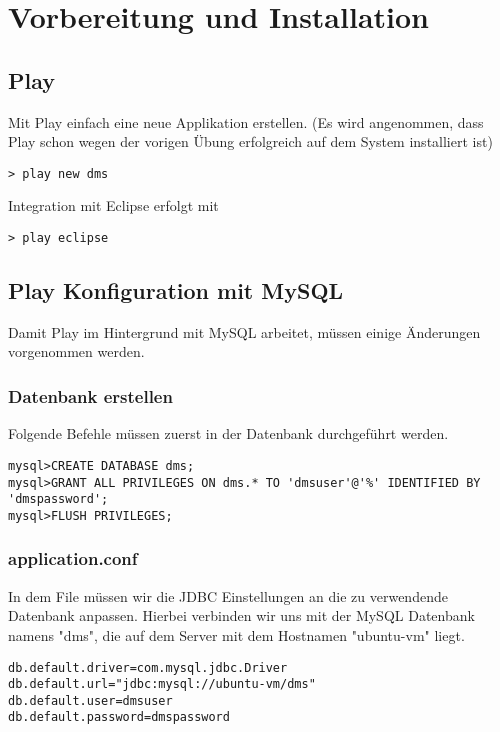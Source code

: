 \documentclass[11pt, a4paper]{article}
\begin{document}
\section{Vorbereitung und Installation}

\subsection{Play}

Mit Play einfach eine neue Applikation erstellen. (Es wird angenommen, dass Play schon wegen der vorigen Übung erfolgreich auf dem System installiert ist)

\begin{lstlisting}
> play new dms
\end{lstlisting}

Integration mit Eclipse erfolgt mit 

\begin{lstlisting}
> play eclipse
\end{lstlisting}

\subsection{Play Konfiguration mit MySQL}

Damit Play im Hintergrund mit MySQL arbeitet, müssen einige Änderungen vorgenommen werden.

\subsubsection*{Datenbank erstellen}

Folgende Befehle müssen zuerst in der Datenbank durchgeführt werden.

\begin{lstlisting}
mysql>CREATE DATABASE dms;
mysql>GRANT ALL PRIVILEGES ON dms.* TO 'dmsuser'@'%' IDENTIFIED BY 'dmspassword';
mysql>FLUSH PRIVILEGES;\end{lstlisting}


\subsubsection*{application.conf}

In dem File müssen wir die JDBC Einstellungen an die zu verwendende Datenbank anpassen. Hierbei verbinden wir uns mit der MySQL Datenbank namens "dms", die auf dem Server mit dem Hostnamen "ubuntu-vm" liegt. 

\begin{lstlisting}
db.default.driver=com.mysql.jdbc.Driver
db.default.url="jdbc:mysql://ubuntu-vm/dms"
db.default.user=dmsuser
db.default.password=dmspassword\end{lstlisting}
\end{document}
